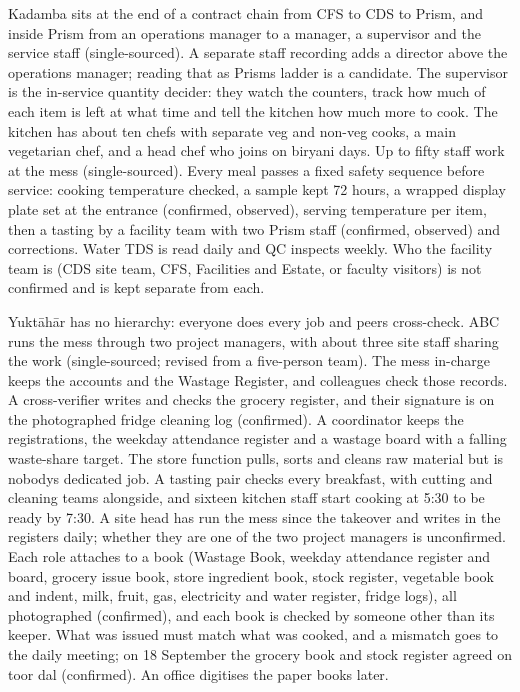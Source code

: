 \documentclass[
  10pt,
  table]{article}
\begin{document}
Kadamba sits at the end of a contract chain from CFS to CDS to Prism, and inside Prism from an operations manager to a manager, a supervisor and the service staff (single-sourced). A separate staff recording adds a director above the operations manager; reading that as Prism\textquotesingle s ladder is a candidate. The supervisor is the in-service quantity decider: they watch the counters, track how much of each item is left at what time and tell the kitchen how much more to cook. The kitchen has about ten chefs with separate veg and non-veg cooks, a main vegetarian chef, and a head chef who joins on biryani days. Up to fifty staff work at the mess (single-sourced). Every meal passes a fixed safety sequence before service: cooking temperature checked, a sample kept 72 hours, a wrapped display plate set at the entrance (confirmed, observed), serving temperature per item, then a tasting by a facility team with two Prism staff (confirmed, observed) and corrections. Water TDS is read daily and QC inspects weekly. Who the facility team is (CDS site team, CFS, Facilities and Estate, or faculty visitors) is not confirmed and is kept separate from each.

Yuktāhār has no hierarchy: everyone does every job and peers cross-check. ABC runs the mess through two project managers, with about three site staff sharing the work (single-sourced; revised from a five-person team). The mess in-charge keeps the accounts and the Wastage Register, and colleagues check those records. A cross-verifier writes and checks the grocery register, and their signature is on the photographed fridge cleaning log (confirmed). A coordinator keeps the registrations, the weekday attendance register and a wastage board with a falling waste-share target. The store function pulls, sorts and cleans raw material but is nobody\textquotesingle s dedicated job. A tasting pair checks every breakfast, with cutting and cleaning teams alongside, and sixteen kitchen staff start cooking at 5:30 to be ready by 7:30. A site head has run the mess since the takeover and writes in the registers daily; whether they are one of the two project managers is unconfirmed. Each role attaches to a book (Wastage Book, weekday attendance register and board, grocery issue book, store ingredient book, stock register, vegetable book and indent, milk, fruit, gas, electricity and water register, fridge logs), all photographed (confirmed), and each book is checked by someone other than its keeper. What was issued must match what was cooked, and a mismatch goes to the daily meeting; on 18 September the grocery book and stock register agreed on toor dal (confirmed). An office digitises the paper books later.
\end{document}
